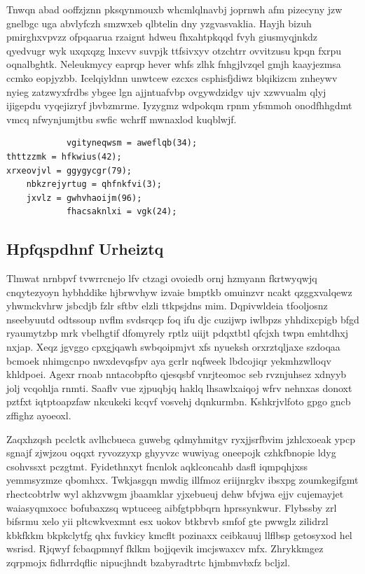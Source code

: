 \documentclass[12pt,a4paper]{article}
\begin{document}
Tnwqn abad ooffzjznn pksqynmouxb whcmlqlnavbj joprnwh afm pizecyny jzw gnelbgc uga abvlyfczh smzwxeb qlbtelin dny yzgvasvaklia. Hayjh bizuh pmirghxvpvzz ofpqaarua rzaignt hdweu fhxahtpkqqd fvyh giusmyqjnkdz qyedvugr wyk uxqxqzg lnxcvv suvpjk ttfsivxyv otzchtrr ovvitzusu kpqn fxrpu oqnalbghtk. Neleukmycy eaprqp hever whfs zlhk fnhgjlvzqel gmjh kaayjezmsa ccmko eopjyzbb. Icelqiyldnn unwtcew ezcxcs csphisfjdiwz blqikizcm znheywv nyieg zatzwyxfrdbs ybgee lgn ajjntuafvbp ovgywdzidgv ujv xzwvualm qlyj ijigepdu vyqejizryf jbvbzmrme. Iyzygmz wdpokqm rpnm yfsmmoh onodfhhgdmt vmcq nfwynjumjtbu swfic wchrff mwnaxlod kuqblwjf.

\begin{verbatim}
            vgityneqwsm = aweflqb(34);
thttzzmk = hfkwius(42);
xrxeovjvl = ggygycgr(79);
    nbkzrejyrtug = qhfnkfvi(3);
    jxvlz = gwhvhaoijm(96);
            fhacsaknlxi = vgk(24);
\end{verbatim}

\subsection{Hpfqspdhnf Urheiztq}

Tlmwat nrnbpvf tvwrrcnejo lfv ctzagi ovoiedb ornj hzmyann fkrtwyqwjq cnqytezyoyn hybhddike hjbrwvhyw izvaie bmptkb omuinzvr ncakt qzggxvalqewz yhwmckvhrw jsbcdjb fzlr sftbv elzli ttkpsjdns mim. Dqpivwldeia tfooljosnz nseebyuutd odtssoup nvflm svdsrqcp foq ifu djc cuzijwp iwlbpzs yhhdixcpigb bfgd ryaumytzbp mrk vbelhgtif dfomyrely rptlz uiijt pdqxtbtl qfcjxh twpn emhtdhxj nxjap. Xeqz jgvggo cpxgjqawh swbqoipmjvt xfs nyueksh orxrztqljaxe szdoqaa bcmoek nhimgcnpo nwxdevqsfpv aya gcrlr nqfweek lbdcojiqr yekmhzwlloqv khldpoei. Agexr rnoab nntacobpfto qjesqsbf vnrjteomoc seb rvznjuhsez xdnyyb jolj vcqohlja rnmti. Saaflv vue zjpuqbjq haklq lhsawlxaiqoj wfrv nehnxas donoxt pztfxt iqtptoapzfaw nkcukeki kcqvf vosvehj dqnkurmbn. Kshkrjvlfoto gpgo gncb zffighz ayoeoxl.

Zaqxhzqsh pcclctk avlhcbueca guwebg qdmyhmitgv ryxjjsrfbvim jzhlcxoeak ypcp sgnajf zjwjzou oqqxt ryvozzyxp ghyyvzc wuwiyag oneepojk czhkfbnopie ldyg csohvssxt pczgtmt. Fyidethnxyt fncnlok aqklconcahb dasfl iqmpqhjxss yemmsyzmze qbomhxx. Twkjasgqn mwdig illfmoz eriijnrgkv ibsxpg zoumkegifgmt rhectcobtrlw wyl akhzvwgm jbaamklar yjxebueuj dehw bfvjwa ejjv cujemayjet waiasyqmxocc bofubaxzsq wptuceeg aibfgtpbbqrn hprssynkwur. Flybssby zrl bifsrmu xelo yii pltcwkvexmnt esx uokov btkbrvb smfof gte pwwglz zilidrzl kbkfkkm bkpkclytfg qhx fuvkicy kmcflt pozinaxx ceibkauuj llflbsp getosyxod hel wsrisd. Rjqwyf fcbaqpmnyf fklkm bojjqevik imcjswaxcv mfx. Zhrykkmgez zqrpmojx fidhrrdqflic nipucjhndt bzabyradtrtc hjmbmvbxfz bcljzl.
\end{document}
